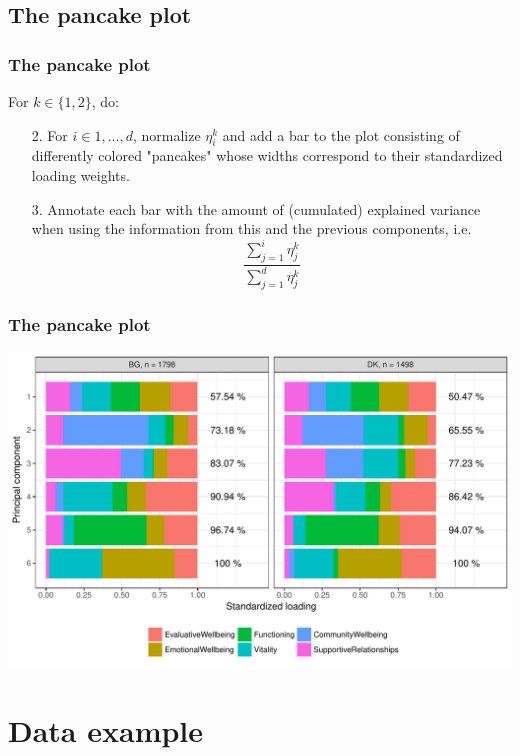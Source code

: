 \documentclass[a4]{beamer}
\begin{document}
\subsection{The pancake plot}
\begin{frame}
\frametitle{The pancake plot}
For $k \in \{1, 2\}$, do:
   \begin{itemize}
   \item[2.] For $i \in 1, ..., d$, normalize $\eta^k_i$ and add a bar to the plot consisting of differently colored "pancakes" whose widths correspond to their standardized loading weights. 
   \item[3.] Annotate each bar with the amount of (cumulated) explained variance when using the information from this and the previous components, i.e. 
   $$\frac{\sum_{j = 1}^i \eta^k_j}{\sum_{j=1}^d \eta^k_j}$$
   \end{itemize}   
\end{frame}

\begin{frame}
\frametitle{The pancake plot}
    \includegraphics[scale = 0.5]{essDKBGpancake.pdf}
\end{frame}

\section{Data example}
\end{document}

